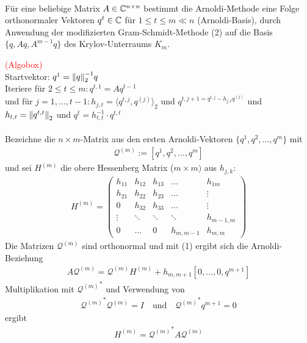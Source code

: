 \begin{defbox} \ \\
  Für eine beliebige Matrix $A\in\mathbb C  ^{n\times n}$ bestimmt die Arnoldi-Methode eine Folge orthonormaler 
  Vektoren $q^t\in\mathbb C  $ für $1\leq t \leq m \ll n$ (Arnoldi-Basis), durch Anwendung der modifizierten 
  Gram-Schmidt-Methode (2) auf die Basis $\{q,Aq,A^{m-1}q\}$ des Krylov-Unterraums $K_m$.
\end{defbox}
\textcolor{red}{(Algobox)} \\
Startvektor: $q^1=\vertn{2}{q}^{-1}_2 q$ \\
Iteriere für $2\leq t\leq m: q^{t,1}=Aq^{t-1}$ \\
und für $j=1,\dots,t-1: h_{j,t} = \langle q^{t,j},q^{(j)}\rangle_2$ und $q^{t,j+1=q^{t,j}-h_{j,t}q^{(j)}}$ und $h_{t,t}=\vertn{2}{q^{t,t}}_2$ 
und $q^t = h_{t,t}^{-1}\cdot q^{t,t}$ \\ \\
Bezeichne die $n\times m$-Matrix aus den ersten Arnoldi-Vektoren $\{q^1,q^2,\dots,q^m\}$ mit 
\begin{align*}\mathcal{Q}^{(m)}:=[q^1,q^2,\dots,q^m]\end{align*} und sei $H^{(m)}$ die obere Hessenberg Matrix ($m\times m)$ aus $h_{j,k}$:
\begin{align*}H^{(m)} = \begin{pmatrix}
  h_{11} & h_{12} & h_{13} & \dots & h_{1m} \\
  h_{21} & h_{22} & h_{23} & \dots & \vdots \\
  0 & h_{32} & h_{33} & \dots & \vdots \\
  \vdots & \ddots &  \ddots &   \ddots &  h_{m-1,m} \\
  0 &\dots & 0 & h_{m,m-1} & h_{m,m}
\end{pmatrix}\end{align*}
Die Matrizen $\mathcal{Q}^{(m)}$ sind orthonormal und mit (1) ergibt sich die Arnoldi-Beziehung 
\begin{align*}A\mathcal{Q}^{(m)} = \mathcal{Q}^{(m)} H^{(m)} + h_{m,m+1}[0,\dots,0,q^{m+1}]\tag{3}\end{align*}
Multiplikation mit ${\mathcal{Q}^{(m)}}^*$  und Verwendung von 
\begin{align*}{\mathcal{Q}^{(m)}}^* \mathcal{Q}^{(m)} = I \quad \text{und}\quad {\mathcal{Q}^{(m)}}^* q^{m+1}=0\end{align*}
ergibt 
\begin{align*}H^{(m)} = {\mathcal{Q}^{(m)}}^* A \mathcal{Q}^{(m)}\end{align*}
